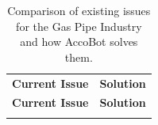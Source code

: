 \documentclass[11pt]{article}		%
\begin{document}
		\setlength{\tabcolsep}{13pt}	%
		\renewcommand{\arraystretch}{1.4}	%
		
		
		\begin{longtable}[c]{| m{} | m{} |}
			\hiderowcolors
    		\caption{Comparison of existing issues for the Gas Pipe Industry and how AccoBot solves them.}\\
			\hline
			\rowcolor{headerBlue} \textbf{Current Issue} & \textbf{Solution}\\
			\hline
			\endfirsthead

			\hline
			\rowcolor{headerBlue} \textbf{Current Issue} & \textbf{Solution}\\
			\hline
			\endhead
			
			\hline
			\endlastfoot
			

\end{longtable}
\end{document}
